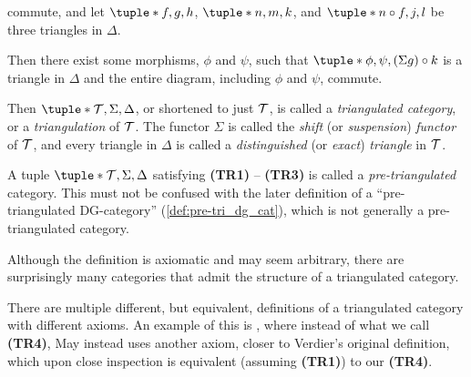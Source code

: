 \begin{definition}
\begin{enumerate}[label={(\bfseries TR\arabic*)}]
{\begin{center}
            \end{center}
            commute, and let \( \tuple*{f, g, h} \), \( \tuple*{n, m, k} \), and \( \tuple*{n \circ f, j, l} \) be three triangles in \( \Delta \).

            Then there exist some morphisms, \( \phi \) and \( \psi \), such that \( \tuple*{\phi, \psi, (\Sigma g) \circ k} \) is a triangle in \( \Delta \) and the entire diagram, including \( \phi \) and \( \psi \), commute.
        }
    \end{enumerate}

    Then \( \tuple*{ \Tc, \Sigma, \Delta } \), or shortened to just \( {\mathcal{T}} \), is called a \emph{triangulated category}, or a \emph{triangulation} of \( {\mathcal{T}} \). The functor \( \Sigma \) is called the \emph{shift} (or \emph{suspension}) \emph{functor} of \( {\mathcal{T}} \), and every triangle in \( \Delta \) is called a \emph{distinguished} (or \emph{exact}) \emph{triangle} in \( {\mathcal{T}} \). 
\end{definition}

A tuple \( \tuple*{\Tc, \Sigma, \Delta} \) satisfying {\bf (TR1)} -- {\bf (TR3)} is called a \emph{pre-triangulated} category. This must not be confused with the later definition of a ``pre-triangulated DG-category'' (\autoref{def:pre-tri_dg_cat}), which is not generally a pre-triangulated category.

Although the definition is axiomatic and may seem arbitrary, there are surprisingly many categories that admit the structure of a triangulated category.

There are multiple different, but equivalent, definitions of a triangulated category with different axioms. An example of this is \cite[Definition 2.1]{May_2001}, where instead of what we call {\bf (TR4)}, May instead uses another axiom, closer to Verdier's original definition, which upon close inspection is equivalent (assuming {\bf (TR1)}) to our {\bf (TR4)}.

